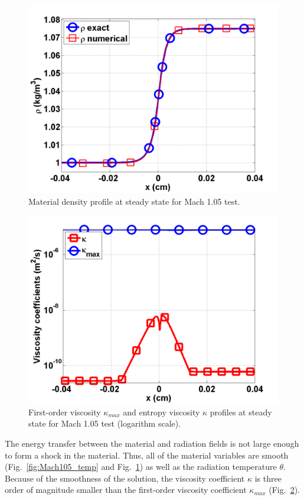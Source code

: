 \documentclass[review]{elsarticle}
\newcommand{\fig}[1]{Fig.~\ref{#1}}                      %
\begin{document}
\begin{figure}[H]
                \centering
                \includegraphics[width=\textwidth]{Mach_1p05_nel_500_density}
        \caption{Material density profile at steady state for Mach 1.05 test.}\label{fig:Mach105_density}
\end{figure}
\begin{figure}[H]
                \centering
                \includegraphics[width=\textwidth]{Mach_1p05_nel_500_viscosity.png}
        \caption{First-order viscosity $\kappa_{max}$ and entropy viscosity $\kappa$ profiles at steady state for Mach 1.05 test (logarithm scale).}\label{fig:Mach105_viscosity}
\end{figure}
The energy transfer between the material and radiation fields is not large enough to form a shock in the material. Thus, all of the material variables are smooth (\fig{fig:Mach105_temp} and \fig{fig:Mach105_density}) as well as the radiation temperature $\theta$. Because of the smoothness of the solution, the viscosity coefficient $\kappa$ is three order of magnitude smaller than the first-order viscosity coefficient $\kappa_{max}$ (\fig{fig:Mach105_viscosity}).
\end{document}
